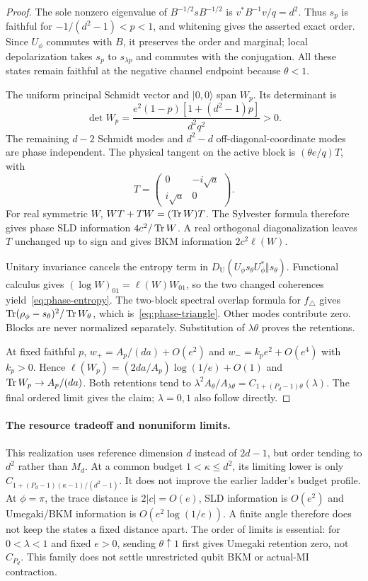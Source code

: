 \begin{proof}
The sole nonzero eigenvalue of $B^{-1/2}sB^{-1/2}$ is $v^*B^{-1}v/q=d^2$. Thus $s_p$ is faithful for $-1/(d^2-1)<p<1$, and whitening gives the asserted exact order. Since $U_\phi$ commutes with $B$, it preserves the order and marginal; local depolarization takes $s_p$ to $s_{\lambda p}$ and commutes with the conjugation. All these states remain faithful at the negative channel endpoint because $\theta<1$.

The uniform principal Schmidt vector and $|0,0\rangle$ span $W_p$. Its determinant is
\[
 \det W_p=\frac{e^2(1-p)[1+(d^2-1)p]}{d^2q^2}>0.
\]
The remaining $d-2$ Schmidt modes and $d^2-d$ off-diagonal-coordinate modes are phase independent. The physical tangent on the active block is $(\theta e/q)T$, with
\[
 T=\begin{pmatrix}0&-i\sqrt a\\i\sqrt a&0\end{pmatrix}.
\]
For real symmetric $W$, $WT+TW=(\operatorname{Tr} W)T$. The Sylvester formula therefore gives phase SLD information $4c^2/\operatorname{Tr} W$. A real orthogonal diagonalization leaves $T$ unchanged up to sign and gives BKM information $2c^2\ell(W)$.

Unitary invariance cancels the entropy term in $D_{\mathrm U}(U_\phi s_\theta U_\phi^*\Vert s_\theta)$. Functional calculus gives $(\log W)_{01}=\ell(W)W_{01}$, so the two changed coherences yield~\eqref{eq:phase-entropy}. The two-block spectral overlap formula for $f_\triangle$ gives $\operatorname{Tr}(\rho_\phi-s_\theta)^2/\operatorname{Tr} W_\theta$, which is~\eqref{eq:phase-triangle}. Other modes contribute zero. Blocks are never normalized separately. Substitution of $\lambda\theta$ proves the retentions.

At fixed faithful $p$, $w_+=A_p/(da)+O(e^2)$ and $w_-=k_pe^2+O(e^4)$ with $k_p>0$. Hence $\ell(W_p)=(2da/A_p)\log(1/e)+O(1)$ and $\operatorname{Tr} W_p\to A_p/(da)$. Both retentions tend to $\lambda^2A_\theta/A_{\lambda\theta}=C_{1+(P_d-1)\theta}(\lambda)$. The final ordered limit gives the claim; $\lambda=0,1$ also follow directly.
\end{proof}

\paragraph{The resource tradeoff and nonuniform limits.}
This realization uses reference dimension $d$ instead of $2d-1$, but order tending to $d^2$ rather than $M_d$. At a common budget $1<\kappa\le d^2$, its limiting lower is only $C_{1+(P_d-1)(\kappa-1)/(d^2-1)}$. It does not improve the earlier ladder's budget profile. At $\phi=\pi$, the trace distance is $2|c|=O(e)$, SLD information is $O(e^2)$ and Umegaki/BKM information is $O(e^2\log(1/e))$. A finite angle therefore does not keep the states a fixed distance apart. The order of limits is essential: for $0<\lambda<1$ and fixed $e>0$, sending $\theta\uparrow1$ first gives Umegaki retention zero, not $C_{P_d}$. This family does not settle unrestricted qubit BKM or actual-MI contraction.

